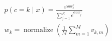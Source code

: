 \documentclass[border=6pt]{standalone}
\begin{document}
\color{ink}\begin{minipage}{165pt}\centering$\displaystyle \begin{gathered}p(c=k\mid x)=\frac{e^{\alpha u w_k^\top}}{\sum_{j=1}^K e^{\alpha u w_j^\top}}\\[9pt]w_k=\operatorname{normalize}\!\left(\frac1M\sum_{m=1}^M v_{k,m}\right)\end{gathered}$\end{minipage}
\end{document}
